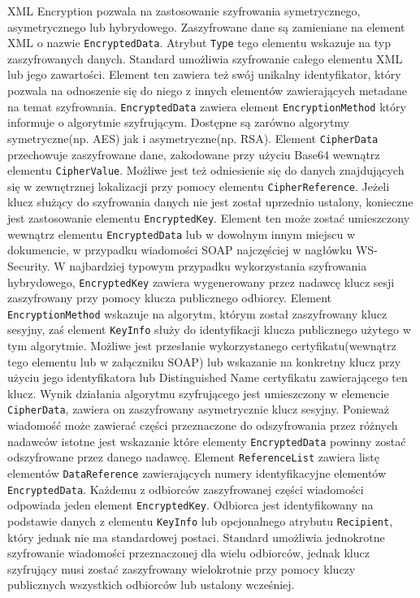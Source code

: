 XML Encryption pozwala na zastosowanie szyfrowania symetrycznego, asymetrycznego lub hybrydowego. 
Zaszyfrowane dane są zamieniane na element XML o nazwie \texttt{EncryptedData}. Atrybut \texttt{Type} tego elementu wskazuje na typ zaszyfrowanych danych. Standard umożliwia szyfrowanie całego elementu XML lub jego zawartości. Element ten zawiera też swój unikalny identyfikator, który pozwala na odnoszenie się do niego z innych elementów zawierających metadane na temat szyfrowania. \texttt{EncryptedData} zawiera element \texttt{EncryptionMethod} który informuje o algorytmie szyfrującym. Dostępne są zarówno algorytmy symetryczne(np. AES) jak i asymetryczne(np. RSA). Element \texttt{CipherData} przechowuje zaszyfrowane dane, zakodowane przy użyciu Base64 wewnątrz elementu \texttt{CipherValue}. Możliwe jest też odniesienie się do danych znajdujących się w zewnętrznej lokalizacji przy pomocy elementu \texttt{CipherReference}.
Jeżeli klucz służący do szyfrowania danych nie jest został uprzednio ustalony, konieczne jest zastosowanie elementu \texttt{EncryptedKey}. Element ten może zostać umieszczony wewnątrz elementu \texttt{EncryptedData} lub w dowolnym innym miejscu w dokumencie, w przypadku wiadomości SOAP najczęściej w nagłówku WS-Security.
W najbardziej typowym przypadku wykorzystania szyfrowania hybrydowego, \texttt{EncryptedKey} zawiera wygenerowany przez nadawcę klucz sesji zaszyfrowany przy pomocy klucza publicznego odbiorcy. Element \texttt{EncryptionMethod} wskazuje na algorytm, którym został zaszyfrowany klucz sesyjny, zaś element \texttt{KeyInfo} służy do identyfikacji klucza publicznego użytego w tym algorytmie. Możliwe jest przesłanie wykorzystanego certyfikatu(wewnątrz tego elementu lub w załączniku SOAP) lub wskazanie na konkretny klucz przy użyciu jego identyfikatora lub Distinguished Name certyfikatu zawierającego ten klucz. Wynik działania algorytmu szyfrującego jest umieszczony w elemencie \texttt{CipherData}, zawiera on zaszyfrowany asymetrycznie klucz sesyjny. 
Ponieważ wiadomość może zawierać części przeznaczone do odszyfrowania przez różnych nadawców istotne jest wskazanie które elementy \texttt{EncryptedData} powinny zostać odszyfrowane przez danego nadawcę. Element \texttt{ReferenceList} zawiera listę elementów \texttt{DataReference} zawierających numery identyfikacyjne elementów \texttt{EncryptedData}. 
Każdemu z odbiorców zaszyfrowanej części wiadomości odpowiada jeden element \texttt{EncryptedKey}. Odbiorca jest identyfikowany na podstawie danych z elementu \texttt{KeyInfo} lub opcjonalnego atrybutu \texttt{Recipient}, który jednak nie ma standardowej postaci. \cite{Eastlake:02:XES} 
Standard umożliwia jednokrotne szyfrowanie wiadomości przeznaczonej dla wielu odbiorców, jednak klucz szyfrujący musi zostać zaszyfrowany wielokrotnie przy pomocy kluczy publicznych wszystkich odbiorców lub ustalony wcześniej. 


